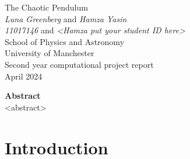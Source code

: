 \documentclass[11pt]{article} %
\begin{document}

\begin{titlepage} %
\begin{center} %

{\Huge The Chaotic Pendulum}\\[0.5cm] %
\textit{Luna Greenberg} and \textit{Hamza Yasin}~\\[0.3cm] %
\textit{11017146} and \textit{<Hamza put your student ID here>}~\\[0.3cm]
School of Physics and Astronomy~\\[0.3cm]
University of Manchester~\\[0.3cm]
Second year computational project report~\\[0.3cm]
April 2024~\\[2cm]


\end{center}
{\Large \textbf{Abstract}}~\\[0.3cm]
    <abstract>


\end{titlepage}
\clearpage
{} %
\setcounter{page}{2} %

\newpage %

\section{Introduction} 
\label{intro}
\end{document}
